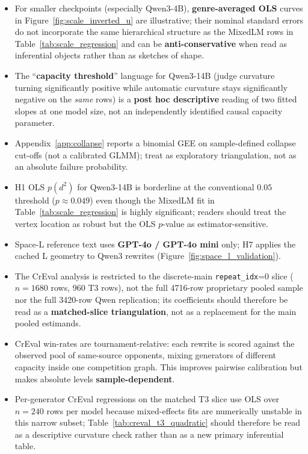 \documentclass[sigconf,nonacm]{acmart}
\begin{document}
\begin{itemize}\itemsep2pt
\item For smaller checkpoints (especially Qwen3-4B), \textbf{genre-averaged OLS} curves in Figure~\ref{fig:scale_inverted_u} are illustrative; their nominal standard errors do not incorporate the same hierarchical structure as the MixedLM rows in Table~\ref{tab:scale_regression} and can be \textbf{anti-conservative} when read as inferential objects rather than as sketches of shape.
\item The ``\textbf{capacity threshold}'' language for Qwen3-14B (judge curvature turning significantly positive while automatic curvature stays significantly negative on the \emph{same} rows) is a \textbf{post hoc descriptive} reading of two fitted slopes at one model size, not an independently identified causal capacity parameter.
\item Appendix~\ref{app:collapse} reports a binomial GEE on sample-defined collapse cut-offs (not a calibrated GLMM); treat as exploratory triangulation, not as an absolute failure probability.
\item H1 OLS $p(d^2)$ for Qwen3-14B is borderline at the conventional $0.05$ threshold ($p{\approx}0.049$) even though the MixedLM fit in Table~\ref{tab:scale_regression} is highly significant; readers should treat the vertex location as robust but the OLS $p$-value as estimator-sensitive.
\item Space-L reference text uses \textbf{GPT-4o / GPT-4o mini} only; H7 applies the cached L geometry to Qwen3 rewrites (Figure~\ref{fig:space_l_validation}).
\item The CrEval analysis is restricted to the discrete-main \texttt{repeat\_idx}{=}0 slice ($n{=}1680$ rows, 960 T3 rows), not the full 4716-row proprietary pooled sample nor the full 3420-row Qwen replication; its coefficients should therefore be read as a \textbf{matched-slice triangulation}, not as a replacement for the main pooled estimands.
\item CrEval win-rates are tournament-relative: each rewrite is scored against the observed pool of same-source opponents, mixing generators of different capacity inside one competition graph. This improves pairwise calibration but makes absolute levels \textbf{sample-dependent}.
\item Per-generator CrEval regressions on the matched T3 slice use OLS over $n{=}240$ rows per model because mixed-effects fits are numerically unstable in this narrow subset; Table~\ref{tab:creval_t3_quadratic} should therefore be read as a descriptive curvature check rather than as a new primary inferential table.
\end{itemize}
\end{document}
